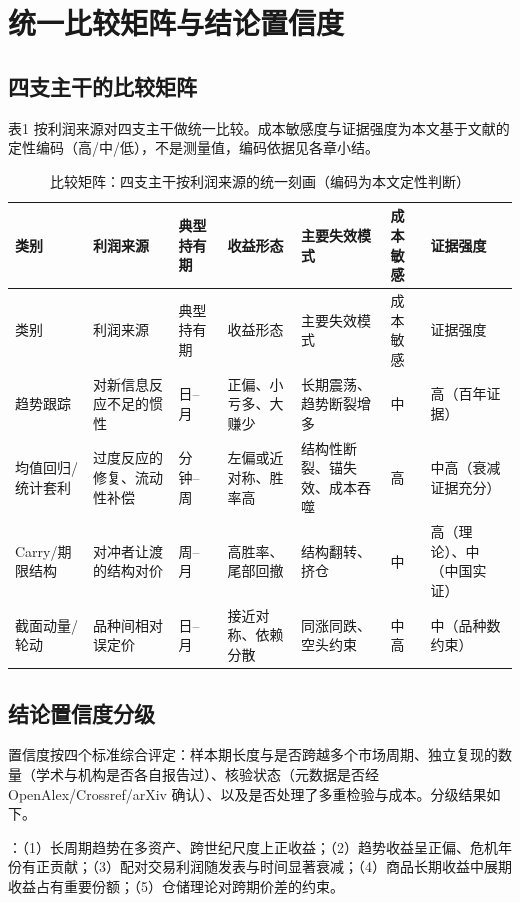 \documentclass[12pt,a4paper]{ctexart}
\begin{document}
\section{统一比较矩阵与结论置信度}

\subsection{四支主干的比较矩阵}

表1 按利润来源对四支主干做统一比较。成本敏感度与证据强度为本文基于文献的定性编码（高/中/低），不是测量值，编码依据见各章小结。


{\small\setlength{\tabcolsep}{4pt}\begin{longtable}{p{54.06pt}p{79.67pt}p{42.68pt}p{56.91pt}p{85.36pt}p{36.99pt}p{36.99pt}}
\caption{比较矩阵：四支主干按利润来源的统一刻画（编码为本文定性判断）}\label{tab:matrix}\\
\toprule
类别 & 利润来源 & 典型持有期 & 收益形态 & 主要失效模式 & 成本敏感 & 证据强度 \\
\midrule
\endfirsthead
\toprule
类别 & 利润来源 & 典型持有期 & 收益形态 & 主要失效模式 & 成本敏感 & 证据强度 \\
\midrule
\endhead
趋势跟踪 & 对新信息反应不足的惯性 & 日–月 & 正偏、小亏多、大赚少 & 长期震荡、趋势断裂增多 & 中 & 高（百年证据） \\
\midrule
均值回归/统计套利 & 过度反应的修复、流动性补偿 & 分钟–周 & 左偏或近对称、胜率高 & 结构性断裂、锚失效、成本吞噬 & 高 & 中高（衰减证据充分） \\
\midrule
Carry/期限结构 & 对冲者让渡的结构对价 & 周–月 & 高胜率、尾部回撤 & 结构翻转、挤仓 & 中 & 高（理论）、中（中国实证） \\
\midrule
截面动量/轮动 & 品种间相对误定价 & 日–月 & 接近对称、依赖分散 & 同涨同跌、空头约束 & 中高 & 中（品种数约束） \\
\bottomrule
\end{longtable}}

\subsection{结论置信度分级}

置信度按四个标准综合评定：样本期长度与是否跨越多个市场周期、独立复现的数量（学术与机构是否各自报告过）、核验状态（元数据是否经OpenAlex/Crossref/arXiv 确认）、以及是否处理了多重检验与成本。分级结果如下。


：（1）长周期趋势在多资产、跨世纪尺度上正收益\cite{04, 05}；（2）趋势收益呈正偏、危机年份有正贡献\cite{13, 15, 18}；（3）配对交易利润随发表与时间显著衰减\cite{35, 36}；（4）商品长期收益中展期收益占有重要份额\cite{50, 52}；（5）仓储理论对跨期价差的约束\cite{70, 71}。
\end{document}
